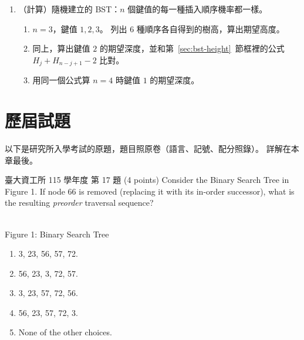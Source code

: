 \begin{enumerate}
\begin{code}{c}{觀念題 9}
// (c) 釋放整棵樹
void free_tree(Node *x)
{
    if (x == NULL)
        return;
    free(x);
    free_tree(x->left);
    free_tree(x->right);
}
\end{code}

\item （計算）隨機建立的 BST：$n$ 個鍵值的每一種插入順序機率都一樣。
\begin{enumerate}
\item $n = 3$，鍵值 $1, 2, 3$。 列出 $6$ 種順序各自得到的樹高，算出期望高度。
\item 同上，算出鍵值 $2$ 的期望深度，並和第~\ref{sec:bst-height}~節框裡的公式
$H_j + H_{n-j+1} - 2$ 比對。
\item 用同一個公式算 $n = 4$ 時鍵值 $1$ 的期望深度。
\end{enumerate}

\end{enumerate}

\section{歷屆試題}
\label{sec:bst-pastexam}

以下是研究所入學考試的原題，題目照原卷（語言、記號、配分照錄）。 詳解在本章最後。

\begin{pastexam}[label={px:bst-1}]{臺大資工所 115 學年度 第 17 題}
(4 points) Consider the Binary Search Tree in Figure 1. If node 66 is removed (replacing it with its in-order successor), what is the resulting \emph{preorder} traversal sequence?
\begin{center}
\\[2pt]
Figure 1: Binary Search Tree
\end{center}
\begin{enumerate}[label=(\Alph*)]
\item 3, 23, 56, 57, 72.
\item 56, 23, 3, 72, 57.
\item 3, 23, 57, 72, 56.
\item 56, 23, 57, 72, 3.
\item None of the other choices.
\end{enumerate}
\end{pastexam}


